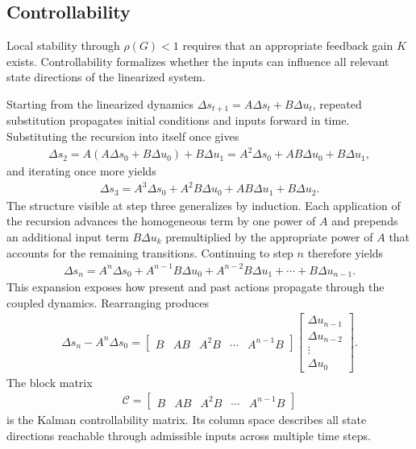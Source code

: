 \documentclass[11pt]{article}
\begin{document}
\subsection{Controllability}
Local stability through $\rho(G) < 1$ requires that an appropriate feedback gain $K$ exists. Controllability formalizes whether the inputs can influence all relevant state directions of the linearized system.

Starting from the linearized dynamics $\Delta s_{t+1} = A\Delta s_t + B\Delta u_t$, repeated substitution propagates initial conditions and inputs forward in time. Substituting the recursion into itself once gives
\begin{align*}
    \Delta s_2 = A(A\Delta s_0 + B\Delta u_0) + B\Delta u_1 = A^2\Delta s_0 + AB\Delta u_0 + B\Delta u_1,
\end{align*}
and iterating once more yields
\begin{align}
    \Delta s_3 = A^3\Delta s_0 + A^2B\Delta u_0 + AB\Delta u_1 + B\Delta u_2.
    \label{eq:expand3}
\end{align}
The structure visible at step three generalizes by induction. Each application of the recursion advances the homogeneous term by one power of $A$ and prepends an additional input term $B\Delta u_{k}$ premultiplied by the appropriate power of $A$ that accounts for the remaining transitions. Continuing to step $n$ therefore yields
\begin{align*}
    \Delta s_n = A^n\Delta s_0 + A^{n-1}B\Delta u_0 + A^{n-2}B\Delta u_1 + \cdots + B\Delta u_{n-1}.
\end{align*}
This expansion exposes how present and past actions propagate through the coupled dynamics. Rearranging produces
\begin{align*}
    \Delta s_n - A^n\Delta s_0
    =
    \begin{bmatrix}
        B & AB & A^2B & \cdots & A^{n-1}B
    \end{bmatrix}
    \begin{bmatrix}
        \Delta u_{n-1} \\
        \Delta u_{n-2} \\
        \vdots \\
        \Delta u_0
    \end{bmatrix}.
\end{align*}
The block matrix
\begin{align}
    \mathcal{C} = \begin{bmatrix} B & AB & A^2B & \cdots & A^{n-1}B \end{bmatrix}
\end{align}
is the Kalman controllability matrix. Its column space describes all state directions reachable through admissible inputs across multiple time steps.
\end{document}
